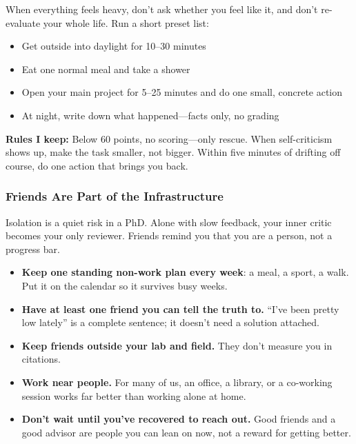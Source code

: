 \documentclass[11pt,a4paper]{article}
\begin{document}
\begin{tcolorbox}[colback=yellow!5,colframe=orange!60,title={Minimum Protocol for Low Days}]
When everything feels heavy, don't ask whether you feel like it, and don't re-evaluate your whole life. Run a short preset list:
\begin{itemize}[leftmargin=1.5em]
    \item[$\Box$] Get outside into daylight for 10--30 minutes
    \item[$\Box$] Eat one normal meal and take a shower
    \item[$\Box$] Open your main project for 5--25 minutes and do one small, concrete action
    \item[$\Box$] At night, write down what happened---facts only, no grading
\end{itemize}
\textbf{Rules I keep:} Below 60 points, no scoring---only rescue. When self-criticism shows up, make the task smaller, not bigger. Within five minutes of drifting off course, do one action that brings you back.
\end{tcolorbox}

\subsubsection{Friends Are Part of the Infrastructure}

Isolation is a quiet risk in a PhD. Alone with slow feedback, your inner critic becomes your only reviewer. Friends remind you that you are a person, not a progress bar.

\begin{itemize}
    \item \textbf{Keep one standing non-work plan every week}: a meal, a sport, a walk. Put it on the calendar so it survives busy weeks.
    \item \textbf{Have at least one friend you can tell the truth to.} ``I've been pretty low lately'' is a complete sentence; it doesn't need a solution attached.
    \item \textbf{Keep friends outside your lab and field.} They don't measure you in citations.
    \item \textbf{Work near people.} For many of us, an office, a library, or a co-working session works far better than working alone at home.
    \item \textbf{Don't wait until you've recovered to reach out.} Good friends and a good advisor are people you can lean on now, not a reward for getting better.
\end{itemize}
\end{document}
